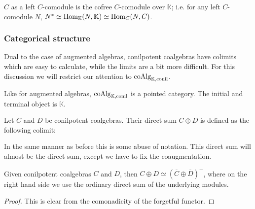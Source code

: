 \documentclass[../thesis.tex]{subfiles}
\begin{document}
                \begin{corollary}
                    $C$ as a left $C$-comodule is the cofree $C$-comodule over $\mathbb{K}$; i.e. for any left $C$-comodule $N$, $N^* \simeq \tt{Hom}_\mathbb{K}(N,\mathbb{K}) \simeq \tt{Hom}_C(N, C)$.
                \end{corollary}

            \subsubsection*{Categorical structure}

                Dual to the case of augmented algebras, conilpotent coalgebras have colimits which are easy to calculate, while the limits are a bit more difficult. For this discussion we will restrict our attention to $\tt{coAlg}_{\mathbb{K},\tt{conil}}$.

                Like for augmented algebras, $\tt{coAlg}_{\mathbb{K},\tt{conil}}$ is a pointed category. The initial and terminal object is $\mathbb{K}$.

                \begin{definition}
                    Let $C$ and $D$ be conilpotent coalgebras. Their direct sum $C \oplus D$ is defined as the following colimit:
                    \begin{center}
                    \end{center}
                \end{definition}

                In the same manner as before this is some abuse of notation. This direct sum will almost be the direct sum, except we have to fix the coaugmentation.

                \begin{lemma}
                    Given conilpotent coalgebras $C$ and $D$, then $C \oplus D \simeq (\overline{C} \oplus \overline{D})^+$, where on the right hand side we use the ordinary direct sum of the underlying modules.
                \end{lemma}

                \begin{proof}
                    This is clear from the comonadicity of the forgetful functor.
                \end{proof}
\end{document}
